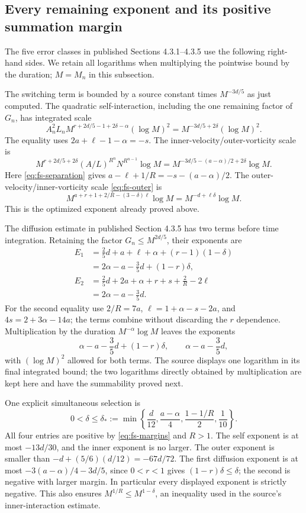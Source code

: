 \subsection{Every remaining exponent and its positive summation margin}

The five error classes in published Sections 4.3.1--4.3.5 use the following
right-hand sides. We retain all logarithms when multiplying the pointwise
bound by the duration; $M=M_n$ in this subsection.

The switching term is bounded by a source constant times $M^{-3d/5}$ as just
computed. The quadratic self-interaction, including the one remaining factor
of $G_n$, has integrated scale
\[
 A_n^2L_nM^{r+2d/5-1+2\delta-\alpha}(\log M)^2
 =M^{-3d/5+2\delta}(\log M)^2.                  \tag{FS11}
\]
The equality uses $2a+\ell-1-\alpha=-s$.
The inner-velocity/outer-vorticity scale is
\[
 M^{r+2d/5+2\delta}(A/L)^{R^n}N^{R^{n-1}}\log M
 =M^{-3d/5-(a-\alpha)/2+2\delta}\log M.          \tag{FS12}
\]
Here \eqref{eq:fs-separation} gives
$a-\ell+1/R=-s-(a-\alpha)/2$.
The outer-velocity/inner-vorticity scale \eqref{eq:fs-outer} is
\[
 M^{a+r+1+2/R-(3-\delta)\ell}\log M
 =M^{-d+\ell\delta}\log M.                     \tag{FS13}
\]
This is the optimized exponent already proved above.

The diffusion estimate in published Section 4.3.5 has two terms before time
integration. Retaining the factor $G_n\leq M^{2d/5}$, their exponents are
\begin{align*}
 E_1&=\frac25d+a+\ell+\alpha+(r-1)(1-\delta)\\
    &=2\alpha-a-\frac35d+(1-r)\delta,\\
 E_2&=\frac25d+2a+\alpha+r+s+\frac2R-2\ell\\
    &=2\alpha-a-\frac35d.
\end{align*}
For the second equality use $2/R=7a$, $\ell=1+\alpha-s-2a$,
and $4s=2+3\alpha-14a$; the terms combine without discarding the $r$ dependence.
Multiplication by the duration $M^{-\alpha}\log M$ leaves the exponents
\[
 \alpha-a-\frac35d+(1-r)\delta,
 \qquad \alpha-a-\frac35d,                     \tag{FS14}
\]
with $(\log M)^2$ allowed for both terms. The source displays one logarithm
in its final integrated bound; the two logarithms directly obtained by
multiplication are kept here and have the summability proved next.

One explicit simultaneous selection is
\[
 0<\delta\leq\delta_*:=\min\left\{
 \frac d{12},\frac{a-\alpha}{4},
 \frac{1-1/R}{2},\frac1{10}\right\}.            \tag{FS15}\label{eq:fs-delta}
\]
All four entries are positive by \eqref{eq:fs-margins} and $R>1$.
The self exponent is at most $-13d/30$, and the inner exponent is no larger.
The outer exponent is smaller than $-d+(5/6)(d/12)=-67d/72$.
The first diffusion exponent is at most
$-3(a-\alpha)/4-3d/5$, since $0<r<1$ gives $(1-r)\delta\leq\delta$;
the second is negative with larger margin. In particular every displayed
exponent is strictly negative. This also ensures $M^{1/R}\leq M^{1-\delta}$,
an inequality used in the source's inner-interaction estimate.

